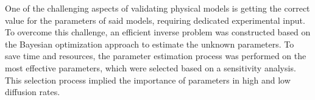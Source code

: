 One of the challenging aspects of validating physical models is getting the correct value for the parameters of said models, requiring dedicated experimental input. To overcome this challenge, an efficient inverse problem was constructed based on the Bayesian optimization approach to estimate the unknown parameters. %
To save time and resources, the parameter estimation process was performed on the most effective parameters, which were selected based on a sensitivity analysis. This selection process implied the importance of parameters in high and low diffusion rates.

